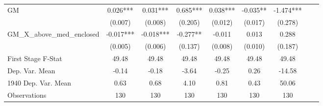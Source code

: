 \begin{tabular}{l*{8}{c}}
\cmidrule(lr){1-7}
GM              &    0.026***&    0.031***&    0.685***&    0.038***&   -0.035** &   -1.474***\\
                &  (0.007)   &  (0.008)   &  (0.205)   &  (0.012)   &  (0.017)   &  (0.278)   \\
\addlinespace
GM\_X\_above\_med\_enclosed&   -0.017***&   -0.018***&   -0.277** &   -0.011   &    0.013   &    0.288   \\
                &  (0.005)   &  (0.006)   &  (0.137)   &  (0.008)   &  (0.010)   &  (0.187)   \\
\midrule
First Stage F-Stat&    49.48   &    49.48   &    49.48   &    49.48   &    49.48   &    49.48   \\
Dep. Var. Mean  &    -0.14   &    -0.18   &    -3.64   &    -0.25   &     0.26   &   -14.58   \\
1940 Dep. Var. Mean&     0.63   &     0.68   &     4.10   &     0.81   &     0.43   &    50.06   \\
Observations    &      130   &      130   &      130   &      130   &      130   &      130   \\
       \bottomrule \end{tabular}
